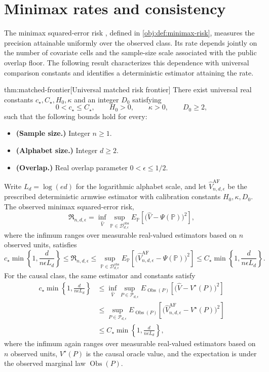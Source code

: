 \section{Minimax rates and consistency}

The minimax squared-error risk , defined in \cref{obj:def:minimax-risk}, measures the precision attainable uniformly over the observed class. Its rate depends jointly on the number of covariate cells and the sample-size scale associated with the public overlap floor. The following result characterizes this dependence with universal comparison constants and identifies a deterministic estimator attaining the rate.

\begin{theoremv}{thm:matched-frontier}[Universal matched risk frontier]
There exist universal real constants \(c_\star,C_\star,H_0,\kappa\) and an integer \(D_0\) satisfying
\[
0<c_\star\le C_\star,\qquad H_0>0,\qquad \kappa>0,\qquad D_0\ge2,
\]
such that the following bounds hold for every:
\begin{itemize}
\item \textbf{(Sample size.)} Integer \(n\ge1\).
\item \textbf{(Alphabet size.)} Integer \(d\ge2\).
\item \textbf{(Overlap.)} Real overlap parameter \(0<\epsilon\le1/2\).
\end{itemize}
Write \(L_d=\log(ed)\) for the logarithmic alphabet scale, and let
\(\widehat V_{n,d,\epsilon}^{\mathrm{AF}}\) be the prescribed deterministic armwise estimator with calibration constants \(H_0,\kappa,D_0\). The observed minimax squared-error risk,
\[
\mathfrak R_{n,d,\epsilon}
=
\inf_{\widehat V}
\sup_{\mathbb P\in\mathcal D_{d,\epsilon}^{\mathrm{obs}}}
E_{\mathbb P}\!\left[
\bigl(\widehat V-\Psi(\mathbb P)\bigr)^2
\right],
\]
where the infimum ranges over measurable real-valued estimators based on \(n\) observed units, satisfies
\[
c_\star\min\left\{1,\frac{d}{n\epsilon L_d}\right\}
\le
\mathfrak R_{n,d,\epsilon}
\le
\sup_{\mathbb P\in\mathcal D_{d,\epsilon}^{\mathrm{obs}}}
E_{\mathbb P}\!\left[
\bigl(\widehat V_{n,d,\epsilon}^{\mathrm{AF}}-\Psi(\mathbb P)\bigr)^2
\right]
\le
C_\star\min\left\{1,\frac{d}{n\epsilon L_d}\right\}.
\]
For the causal class, the same estimator and constants satisfy
\[
\begin{aligned}
c_\star\min\left\{1,\frac{d}{n\epsilon L_d}\right\}
&\le
\inf_{\widehat V}
\sup_{P\in\mathcal P_{d,\epsilon}}
E_{\operatorname{Obs}(P)}\!\left[
\bigl(\widehat V-V^\star(P)\bigr)^2
\right]
\\
&\le
\sup_{P\in\mathcal P_{d,\epsilon}}
E_{\operatorname{Obs}(P)}\!\left[
\bigl(\widehat V_{n,d,\epsilon}^{\mathrm{AF}}-V^\star(P)\bigr)^2
\right]
\\
&\le
C_\star\min\left\{1,\frac{d}{n\epsilon L_d}\right\},
\end{aligned}
\]
where the infimum again ranges over measurable real-valued estimators based on \(n\) observed units, \(V^\star(P)\) is the causal oracle value, and the expectation is under the observed marginal law \(\operatorname{Obs}(P)\).
\end{theoremv}


